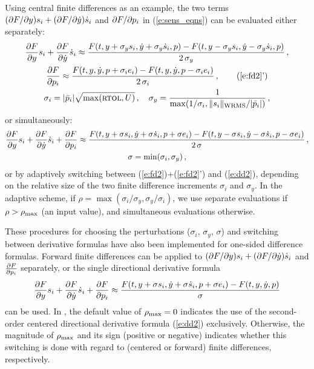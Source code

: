 Using central finite differences as an example, the two terms
$(\partial F / \partial y) s_i + (\partial F / \partial \dot y) \dot s_i$ and $\partial F / \partial p_i$ in (\ref{e:sens_eqns})
can be evaluated either separately:
\begin{gather}
  \dFdy s_i + \dFdyp \dot s_i \approx
  \frac{F(t, y+\sigma_y s_i, \dot y + \sigma_y \dot s_i , p)- F(t, y-\sigma_y s_i, \dot y - \sigma_y \dot s_i , p)}{2\,\sigma_y} \, , \label{e:fd2} \\
  \dFdpi \approx
  \frac{F(t, y, \dot y, p + \sigma_i e_i)- F(t, y, \dot y, p - \sigma_i e_i)}{2\,\sigma_i} \, , \tag{\ref{e:fd2}'} \\
  \sigma_i = |{\bar p}_i| \sqrt{\max( \mbox{\sc rtol} , U)} \, , \quad
  \sigma_y = \frac{1}{\max(1/\sigma_i, \|s_i\|_{\mbox{\scriptsize WRMS}}/|{\bar p}_i|)} \, , \nonumber
\end{gather}
or simultaneously:
\begin{gather}
  \frac{\partial F}{\partial y} s_i + \frac{\partial F}{\partial \dot y} \dot s_i + \frac{\partial F}{\partial p_i} \approx
  \frac{F(t, y+\sigma s_i, \dot y + \sigma \dot s_i , p + \sigma e_i) -
    F(t, y-\sigma s_i, \dot y - \sigma \dot s_i , p - \sigma e_i)}{2\,\sigma} \, , \label{e:dd2} \\
  \sigma = \min(\sigma_i, \sigma_y) \, , \nonumber
\end{gather}
or by adaptively switching between (\ref{e:fd2})+(\ref{e:fd2}') and (\ref{e:dd2}),
depending on the relative size of the two finite difference increments
$\sigma_i$ and $\sigma_y$.  In the adaptive scheme, if
$\rho = \max(\sigma_i/\sigma_y,\sigma_y/\sigma_i)$, we use separate evaluations
if $\rho > \rho_{\max}$ (an input value), and simultaneous evaluations otherwise.

These procedures for choosing the perturbations ($\sigma_i$, $\sigma_y$, $\sigma$)
and switching between derivative
formulas have also been implemented for one-sided difference formulas.
Forward finite differences can be applied to $(\partial F / \partial y) s_i + (\partial F / \partial \dot y) \dot s_i$ and
$\frac{\partial F}{\partial p_i}$ separately, or the single directional derivative formula
\begin{equation*}
\frac{\partial F}{\partial y} s_i + \frac{\partial F}{\partial \dot y} \dot s_i + \frac{\partial F}{\partial p_i} \approx
\frac{F(t, y+\sigma s_i, \dot y + \sigma \dot s_i , p + \sigma e_i) - F(t, y, \dot y, p)}{\sigma}
\end{equation*}
can be used. In {\idas}, the default value of $\rho_{\max}=0$ indicates the use of
the second-order centered directional derivative formula (\ref{e:dd2}) exclusively.
Otherwise, the magnitude of $\rho_{\max}$ and its sign (positive or
negative) indicates whether this switching is done with regard to
(centered or forward) finite differences, respectively.

